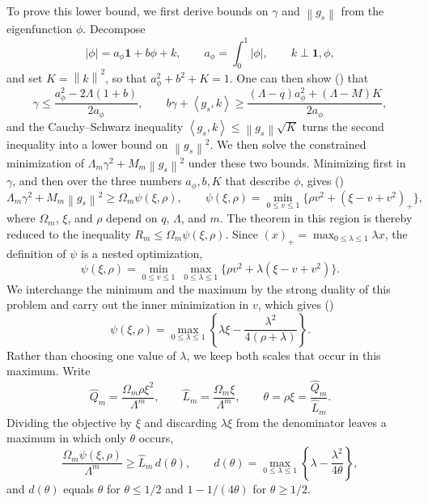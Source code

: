 ﻿\documentclass[11pt]{article}
\numberwithin{equation}{section}
\newcommand{\one}{\mathbf 1}
\newcommand{\ip}[2]{\left\langle #1,#2\right\rangle}
\newcommand{\norm}[1]{\left\lVert #1\right\rVert}
\newcommand{\pos}[1]{\left(#1\right)_{+}}
\begin{document}
\begin{enumerate}[label=\textbf{Section \arabic*.},leftmargin=4.6em,start=2]
  To prove this lower bound, we first derive bounds on $\gamma$ and $\norm{g_s}$ from the eigenfunction $\phi$.
  Decompose
  \[
    |\phi|=a_\phi\one+b\phi+k,
    \qquad a_\phi=\int_0^1|\phi|,
    \qquad k\perp\one,\phi,
  \]
  and set $K=\norm k^2$, so that $a_\phi^2+b^2+K=1$.
  One can then show () that
  \[
    \gamma\le\frac{a_\phi^2-2\Lambda(1+b)}{2a_\phi},
    \qquad
    b\gamma+\ip{g_s}k\ge
    \frac{(\Lambda-q)a_\phi^2+(\Lambda-M)K}{2a_\phi},
  \]
  and the Cauchy--Schwarz inequality $\ip{g_s}k\le\norm{g_s}\sqrt K$ turns the second inequality into a lower bound on $\norm{g_s}^2$.
  We then solve the constrained minimization of $\Lambda_m\gamma^2+M_m\norm{g_s}^2$ under these two bounds.
  Minimizing first in $\gamma$, and then over the three numbers $a_\phi,b,K$ that describe $\phi$, gives ()
  \[
    \Lambda_m\gamma^2+M_m\norm{g_s}^2\ge \Omega_m\psi(\xi,\rho),
    \qquad
    \psi(\xi,\rho)=\min_{0\le v\le1}
    \bigl\{\rho v^2+\pos{\xi-v+v^2}\bigr\},
  \]
  where $\Omega_m$, $\xi$, and $\rho$ depend on $q$, $\Lambda$, and $m$.
  The theorem in this region is thereby reduced to the inequality $R_m\le \Omega_m\psi(\xi,\rho)$.
  Since $\pos x=\max_{0\le\lambda\le1}\lambda x$, the definition of $\psi$ is a nested optimization,
  \[
    \psi(\xi,\rho)=\min_{0\le v\le1}\ \max_{0\le\lambda\le1}
    \bigl\{\rho v^2+\lambda(\xi-v+v^2)\bigr\}.
  \]
  We interchange the minimum and the maximum by the strong duality of this problem and carry out the inner minimization in $v$, which gives ()
  \[
    \psi(\xi,\rho)=\max_{0\le\lambda\le1}
    \left\{\lambda\xi-\frac{\lambda^2}{4(\rho+\lambda)}\right\}.
  \]
  Rather than choosing one value of $\lambda$, we keep both scales that occur in this maximum.
  Write
  \[
    \widehat Q_m=\frac{\Omega_m\rho\xi^2}{\Lambda^m},
    \qquad
    \widehat L_m=\frac{\Omega_m\xi}{\Lambda^m},
    \qquad
    \theta=\rho\xi=\frac{\widehat Q_m}{\widehat L_m}.
  \]
  Dividing the objective by $\xi$ and discarding $\lambda\xi$ from the denominator leaves a maximum in which only $\theta$ occurs,
  \[
    \frac{\Omega_m\psi(\xi,\rho)}{\Lambda^m}\ge\widehat L_m\,d(\theta),
    \qquad
    d(\theta)=\max_{0\le\lambda\le1}\left\{\lambda-\frac{\lambda^2}{4\theta}\right\},
  \]
  and $d(\theta)$ equals $\theta$ for $\theta\le1/2$ and $1-1/(4\theta)$ for $\theta\ge1/2$.


\end{enumerate}
\end{document}
